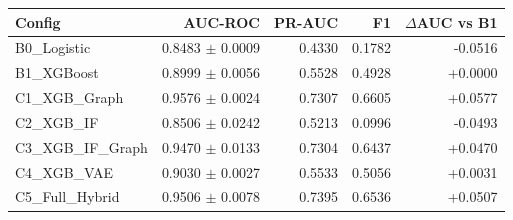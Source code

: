 \begin{tabular}{lrrrr}
\toprule
Config & AUC-ROC & PR-AUC & F1 & $\Delta$AUC vs B1 \\
\midrule
B0_Logistic & 0.8483 $\pm$ 0.0009 & 0.4330 & 0.1782 & -0.0516 \\
B1_XGBoost & 0.8999 $\pm$ 0.0056 & 0.5528 & 0.4928 & +0.0000 \\
C1_XGB_Graph & 0.9576 $\pm$ 0.0024 & 0.7307 & 0.6605 & +0.0577 \\
C2_XGB_IF & 0.8506 $\pm$ 0.0242 & 0.5213 & 0.0996 & -0.0493 \\
C3_XGB_IF_Graph & 0.9470 $\pm$ 0.0133 & 0.7304 & 0.6437 & +0.0470 \\
C4_XGB_VAE & 0.9030 $\pm$ 0.0027 & 0.5533 & 0.5056 & +0.0031 \\
C5_Full_Hybrid & 0.9506 $\pm$ 0.0078 & 0.7395 & 0.6536 & +0.0507 \\
\bottomrule
\end{tabular}

